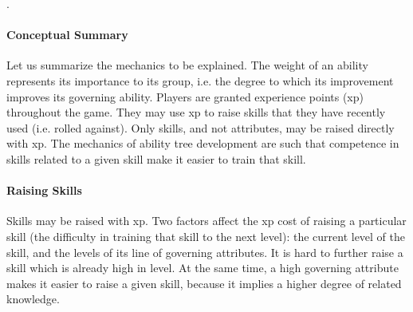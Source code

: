 \documentclass[12pt]{article}
\begin{document}
.

\paragraph{Conceptual Summary} Let us summarize the mechanics to be explained. The weight of an ability represents its importance to its group, i.e. the degree to which its improvement improves its governing ability.
Players are granted experience points (xp) throughout the game. They may use xp to raise skills that they have recently used (i.e. rolled against). Only skills, and not attributes, may be raised directly with xp.
The mechanics of ability tree development are such that competence in skills related to a given skill make it easier to train that skill.

\paragraph{Raising Skills} Skills may be raised with xp. Two factors affect the xp cost of raising a particular skill (the difficulty in training that skill to the next level): the current level of the skill, and the levels of its line of governing attributes. It is hard to further raise a skill which is already high in level. At the same time, a high governing attribute makes it easier to raise a given skill, because it implies a higher degree of related knowledge.
\end{document}
